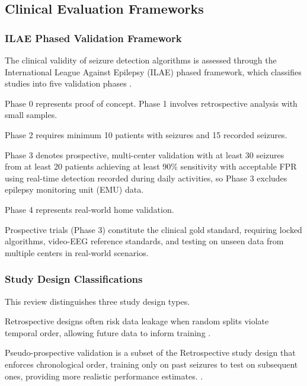 \subsection{Clinical Evaluation Frameworks}

\subsubsection{ILAE Phased Validation Framework}

The clinical validity of seizure detection algorithms is assessed through
the International League Against Epilepsy (ILAE) phased framework,
which classifies studies into five validation phases \parencite{beniczkyStandardsTestingClinical2018, beniczkyAutomatedSeizureDetection2021}.

Phase 0 represents proof of concept. Phase 1 involves retrospective analysis with small samples.

Phase 2 requires minimum 10 patients with seizures and 15 recorded seizures.

Phase 3 denotes prospective, multi-center validation with at least 30 seizures from at least 20 patients achieving at least 90\% sensitivity with acceptable FPR using real-time detection recorded during daily activities, so Phase 3 excludes epilepsy monitoring unit (EMU) data.

Phase 4 represents real-world home validation.

Prospective trials (Phase 3) constitute the clinical gold standard,
requiring locked algorithms, video-EEG reference standards, and testing on
unseen data from multiple centers in real-world scenarios.

\subsubsection{Study Design Classifications}

This review distinguishes three study design types.

Retrospective designs often risk data leakage when random splits violate temporal order, allowing future data to inform training
\parencite{kalousiosECGbasedEpilepticSeizure2024, wongEEGDatasetsSeizure2023}.

Pseudo-prospective validation is a subset of the Retrospective study design that enforces chronological order, training only on past seizures to test on subsequent ones, providing more realistic performance estimates.
\parencite{kalousiosECGbasedEpilepticSeizure2024, luLeveragingChannelCoherence2025}.

